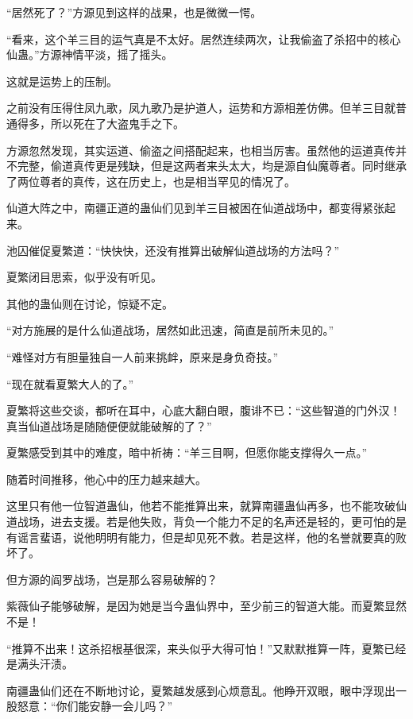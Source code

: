 
\begin{this_body}



“居然死了？”方源见到这样的战果，也是微微一愕。

“看来，这个羊三目的运气真是不太好。居然连续两次，让我偷盗了杀招中的核心仙蛊。”方源神情平淡，摇了摇头。

这就是运势上的压制。

之前没有压得住凤九歌，凤九歌乃是护道人，运势和方源相差仿佛。但羊三目就普通得多，所以死在了大盗鬼手之下。

方源忽然发现，其实运道、偷盗之间搭配起来，也相当厉害。虽然他的运道真传并不完整，偷道真传更是残缺，但是这两者来头太大，均是源自仙魔尊者。同时继承了两位尊者的真传，这在历史上，也是相当罕见的情况了。

仙道大阵之中，南疆正道的蛊仙们见到羊三目被困在仙道战场中，都变得紧张起来。

池囚催促夏繁道：“快快快，还没有推算出破解仙道战场的方法吗？”

夏繁闭目思索，似乎没有听见。

其他的蛊仙则在讨论，惊疑不定。

“对方施展的是什么仙道战场，居然如此迅速，简直是前所未见的。”

“难怪对方有胆量独自一人前来挑衅，原来是身负奇技。”

“现在就看夏繁大人的了。”

夏繁将这些交谈，都听在耳中，心底大翻白眼，腹诽不已：“这些智道的门外汉！真当仙道战场是随随便便就能破解的了？”

夏繁感受到其中的难度，暗中祈祷：“羊三目啊，但愿你能支撑得久一点。”

随着时间推移，他心中的压力越来越大。

这里只有他一位智道蛊仙，他若不能推算出来，就算南疆蛊仙再多，也不能攻破仙道战场，进去支援。若是他失败，背负一个能力不足的名声还是轻的，更可怕的是有谣言蜚语，说他明明有能力，但是却见死不救。若是这样，他的名誉就要真的败坏了。

但方源的阎罗战场，岂是那么容易破解的？

紫薇仙子能够破解，是因为她是当今蛊仙界中，至少前三的智道大能。而夏繁显然不是！

“推算不出来！这杀招根基很深，来头似乎大得可怕！”又默默推算一阵，夏繁已经是满头汗渍。

南疆蛊仙们还在不断地讨论，夏繁越发感到心烦意乱。他睁开双眼，眼中浮现出一股怒意：“你们能安静一会儿吗？”


\end{this_body}
